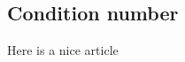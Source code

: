 
\newpage
\subsection{Condition number}%
\label{sec:condition_number}

Here is a nice article \cite{li07}
